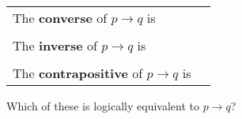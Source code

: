 \begin{tabular}{ll}
    The {\bf  converse}  of $p \to q$ is & \underline{\phantom{\hspace{1.6in}}}\\
    &  \\
    The {\bf  inverse}  of $p \to q$ is  &\underline{\phantom{\hspace{1.6in}}}\\
    &  \\
    The {\bf  contrapositive}  of $p \to q$ is & \underline{\phantom{\hspace{1.6in}}}
    \end{tabular}
    Which of these is logically equivalent to $p \to q$?
    
    \vfill
    \vfill